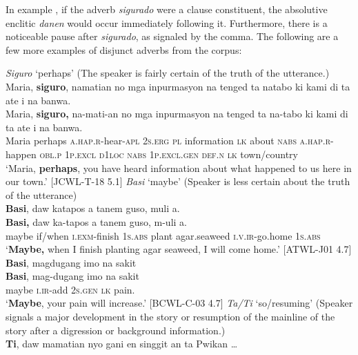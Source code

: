 In example , if the adverb \textit{sigurado} were a clause constituent, the absolutive enclitic \textit{danen} would occur immediately following it. Furthermore, there is a noticeable pause after \textit{sigurado}, as signaled by the comma. The following are a few more examples of disjunct adverbs from the corpus:

\ea
\textit{Siguro} ‘perhaps’ (The speaker is fairly certain of the truth of the utterance.) \\
Maria,  \textbf{siguro},  namatian  no  mga  inpurmasyon  na  tenged  ta natabo  ki  kami  di  ta  ate  i  na  banwa. \\\smallskip
 \gll Maria,  \textbf{siguro,}  na-mati-an  no  mga  inpurmasyon  na  tenged  ta na-tabo  ki  kami  di  ta  ate  i  na  banwa. \\
Maria  perhaps  \textsc{a.hap.r}-hear-\textsc{apl}  2\textsc{s.erg}  \textsc{pl}  information  \textsc{lk}  about  \textsc{nabs}
\textsc{a.hap.r}-happen  \textsc{obl.p}  1\textsc{p.excl}  \textsc{d1loc}  \textsc{nabs}  1\textsc{p.excl.gen}  \textsc{def.n}  \textsc{lk}  town/country \\
\glt `Maria, \textbf{perhaps}, you have heard information about what happened to us here in our town.’ [JCWL-T-18 5.1]
\z
\ea
\textit{Basi} ‘maybe’ (Speaker is less certain about  the truth of the utterance) \\
\textbf{Basi},  daw  katapos  a  tanem  guso,  muli  a. \\\smallskip
 \gll \textbf{Basi,}  daw  ka-tapos  a  tanem  guso,  m-uli  a. \\
maybe  if/when \textsc{i.exm}-finish  1\textsc{s.abs}  plant  agar.seaweed  \textsc{i.v.ir}-go.home  1\textsc{s.abs} \\
\glt ‘\textbf{Maybe,} when I finish planting agar seaweed, I will come home.’ [ATWL-J01 4.7]
\z
\ea
\textbf{Basi},  magdugang  imo  na  sakit \\\smallskip
 \gll \textbf{Basi},  mag-dugang  imo  na  sakit \\
maybe  \textsc{i.ir}-add  2\textsc{s.gen}  \textsc{lk}  pain. \\
\glt ‘\textbf{Maybe}, your pain will increase.’ [BCWL-C-03 4.7]
\z
\ea
\textit{Ta/Ti} ‘so/resuming’ (Speaker signals a major development in the story or resumption of the mainline of the story after a digression or background information.) \\
\textbf{Ti},  daw  mamatian  nyo  gani  en  singgit  an  ta  Pwikan … \\\smallskip
